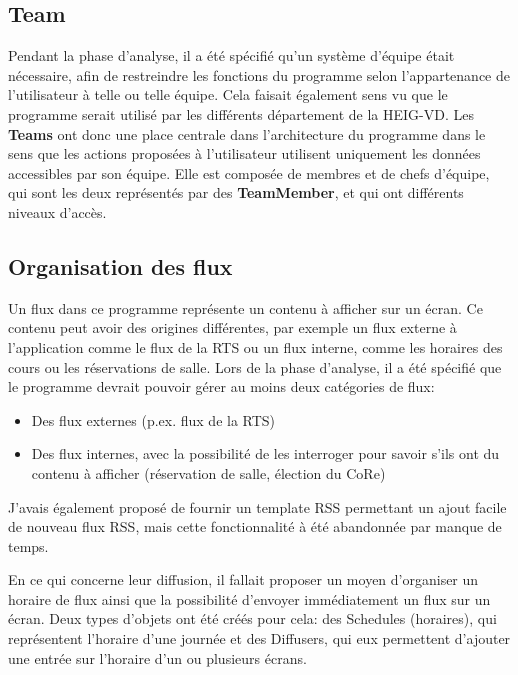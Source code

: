 \documentclass[french]{article}
\begin{document}
\subsection{Team}
Pendant la phase d'analyse, il a été spécifié qu'un système d'équipe était nécessaire, afin de restreindre les fonctions du programme selon l'appartenance de l'utilisateur à telle ou telle équipe. Cela faisait également sens vu que le programme serait utilisé par les différents département de la HEIG-VD.\newline
Les \textbf{Teams} ont donc une place centrale dans l'architecture du programme dans le sens que les actions proposées à l'utilisateur utilisent uniquement les données accessibles par son équipe. Elle est composée de membres et de chefs d'équipe, qui sont les deux représentés par des \textbf{TeamMember}, et qui ont différents niveaux d'accès.

\subsection{Organisation des flux}

Un flux dans ce programme représente un contenu à afficher sur un écran. Ce contenu peut avoir des origines différentes, par exemple un flux externe à l'application comme le flux de la RTS ou un flux interne, comme les horaires des cours ou les réservations de salle. \newline
Lors de la phase d'analyse, il a été spécifié que le programme devrait pouvoir gérer au moins deux catégories de flux:
\begin{itemize}
	\item Des flux externes (p.ex. flux de la RTS)
	\item Des flux internes, avec la possibilité de les interroger pour savoir s'ils ont du contenu à afficher (réservation de salle, élection du CoRe) 
\end{itemize}

J'avais également proposé de fournir un template RSS permettant un ajout facile de nouveau flux RSS, mais cette fonctionnalité à été abandonnée par manque de temps.

En ce qui concerne leur diffusion, il fallait proposer un moyen d'organiser un horaire de flux ainsi que la possibilité d'envoyer immédiatement un flux sur un écran. Deux types d'objets ont été créés pour cela: des Schedules (horaires), qui représentent l'horaire d'une journée et des Diffusers, qui eux permettent d'ajouter une entrée sur l'horaire d'un ou plusieurs écrans. 
\end{document}
